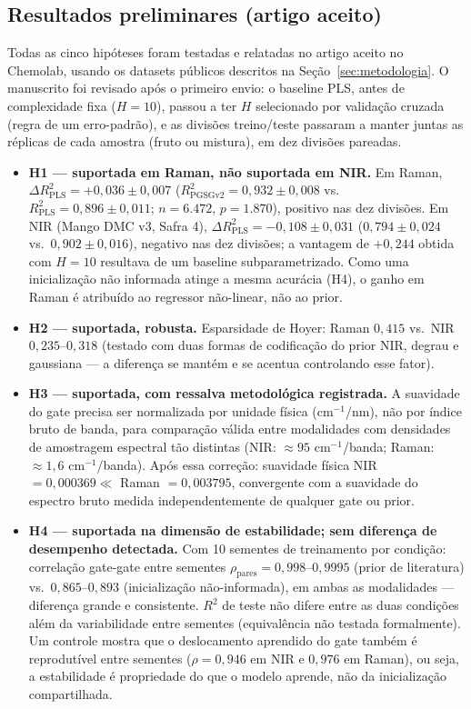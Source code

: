 \documentclass[11pt,a4paper]{article}
\begin{document}
\subsection{Resultados preliminares (artigo aceito)}
\label{sec:resultados-preliminares}

Todas as cinco hipóteses foram testadas e relatadas no artigo aceito no Chemolab, usando os datasets públicos descritos na Seção~\ref{sec:metodologia}. O manuscrito foi revisado após o primeiro envio: o baseline PLS, antes de complexidade fixa ($H=10$), passou a ter $H$ selecionado por validação cruzada (regra de um erro-padrão), e as divisões treino/teste passaram a manter juntas as réplicas de cada amostra (fruto ou mistura), em dez divisões pareadas.

\begin{itemize}
\item \textbf{H1 --- suportada em Raman, não suportada em NIR.} Em Raman, $\Delta R^2_{\text{PLS}} = +0{,}036\pm0{,}007$ ($R^2_{\text{PGSGv2}}=0{,}932\pm0{,}008$ vs.\ $R^2_{\text{PLS}}=0{,}896\pm0{,}011$; $n=6.472$, $p=1.870$), positivo nas dez divisões. Em NIR (Mango DMC v3, Safra 4), $\Delta R^2_{\text{PLS}} = -0{,}108\pm0{,}031$ ($0{,}794\pm0{,}024$ vs.\ $0{,}902\pm0{,}016$), negativo nas dez divisões; a vantagem de $+0{,}244$ obtida com $H=10$ resultava de um baseline subparametrizado. Como uma inicialização não informada atinge a mesma acurácia (H4), o ganho em Raman é atribuído ao regressor não-linear, não ao prior.
\item \textbf{H2 --- suportada, robusta.} Esparsidade de Hoyer: Raman $0{,}415$ vs.\ NIR $0{,}235$--$0{,}318$ (testado com duas formas de codificação do prior NIR, degrau e gaussiana --- a diferença se mantém e se acentua controlando esse fator).
\item \textbf{H3 --- suportada, com ressalva metodológica registrada.} A suavidade do gate precisa ser normalizada por unidade física (cm$^{-1}$/nm), não por índice bruto de banda, para comparação válida entre modalidades com densidades de amostragem espectral tão distintas (NIR: $\approx 95$ cm$^{-1}$/banda; Raman: $\approx 1{,}6$ cm$^{-1}$/banda). Após essa correção: suavidade física NIR $=0{,}000369 \ll$ Raman $=0{,}003795$, convergente com a suavidade do espectro bruto medida independentemente de qualquer gate ou prior.
\item \textbf{H4 --- suportada na dimensão de estabilidade; sem diferença de desempenho detectada.} Com 10 sementes de treinamento por condição: correlação gate-gate entre sementes $\rho_{\text{pares}}=0{,}998$--$0{,}9995$ (prior de literatura) vs.\ $0{,}865$--$0{,}893$ (inicialização não-informada), em ambas as modalidades --- diferença grande e consistente. $R^2$ de teste não difere entre as duas condições além da variabilidade entre sementes (equivalência não testada formalmente). Um controle mostra que o deslocamento aprendido do gate também é reprodutível entre sementes ($\rho=0{,}946$ em NIR e $0{,}976$ em Raman), ou seja, a estabilidade é propriedade do que o modelo aprende, não da inicialização compartilhada.

\end{itemize}
\end{document}
